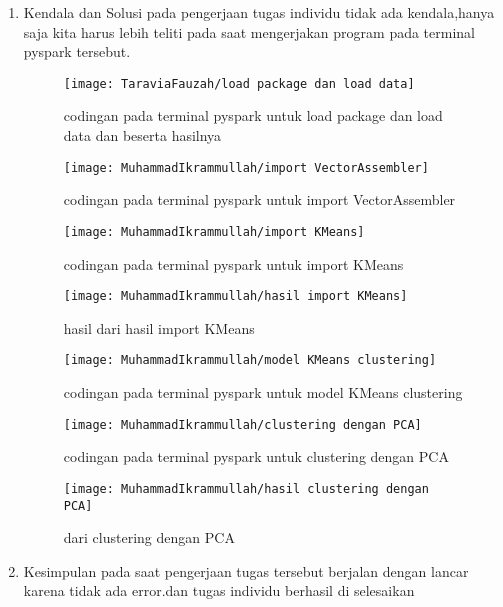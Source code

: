 \begin{enumerate}
\item Kendala dan Solusi
\newline pada pengerjaan tugas individu tidak ada kendala,hanya saja kita harus lebih teliti pada saat mengerjakan program pada terminal pyspark tersebut.

\begin{figure}[!ht]
\texttt{[image: TaraviaFauzah/load package dan load data]}
\caption{codingan pada terminal pyspark untuk load package dan load data dan beserta hasilnya }
\label{gam:perkuliahan2-15}
\end{figure}

\newpage
\begin{figure}[!ht]
\texttt{[image: MuhammadIkrammullah/import VectorAssembler]}
\caption{codingan pada terminal pyspark untuk import VectorAssembler }
\label{gam:perkuliahan2-15}
\end{figure}

\begin{figure}[!ht]
\texttt{[image: MuhammadIkrammullah/import KMeans]}
\caption{codingan pada terminal pyspark untuk import KMeans }
\label{gam:perkuliahan2-15}
\end{figure}

\begin{figure}[!ht]
\texttt{[image: MuhammadIkrammullah/hasil import KMeans]}
\caption{hasil dari hasil import KMeans }
\label{gam:perkuliahan2-15}
\end{figure}

\newpage
\begin{figure}[!ht]
\texttt{[image: MuhammadIkrammullah/model KMeans clustering]}
\caption{codingan pada terminal pyspark untuk model KMeans clustering}
\label{gam:perkuliahan2-15}
\end{figure}

\begin{figure}[!ht]
\texttt{[image: MuhammadIkrammullah/clustering dengan PCA]}
\caption{codingan pada terminal pyspark untuk clustering dengan PCA}
\label{gam:perkuliahan2-15}
\end{figure}

\begin{figure}[!ht]
\texttt{[image: MuhammadIkrammullah/hasil clustering dengan PCA]}
\caption{ dari clustering dengan PCA}
\label{gam:perkuliahan2-15}
\end{figure}

\item Kesimpulan
\newline pada saat pengerjaan tugas tersebut berjalan dengan lancar karena tidak ada error.dan tugas individu berhasil di selesaikan

\end{enumerate}


